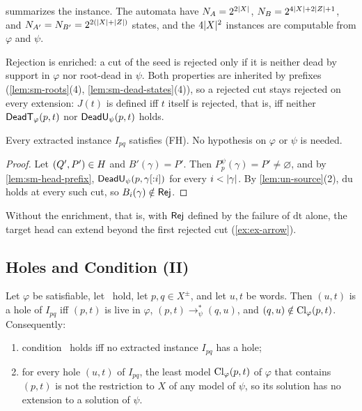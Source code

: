  summarizes the instance. The automata have
$N_A=2^{2\lvert X\rvert}$, $N_B=2^{4\lvert X\rvert+2\lvert Z\rvert+1}$, and
$N_{A'}=N_{B'}=2^{2(\lvert X\rvert+\lvert Z\rvert)}$ states, and the $4\lvert X\rvert^2$ instances are
computable from $\varphi$ and $\psi$.

Rejection is enriched: a cut of the seed is rejected only if it is neither
dead by support in $\varphi$ nor root-dead in $\psi$. Both properties are
inherited by prefixes (\cref{lem:sm-roots}(4), \cref{lem:sm-dead-states}(4)),
so a rejected cut stays rejected on every extension: $J(t)$ is defined iff $t$
itself is rejected, that is, iff neither $\mathsf{DeadT}_\varphi(p,t)$ nor
$\mathsf{DeadU}_\psi(p,t)$ holds.

\begin{lemma}\label{lem:ex-fh}
Every extracted instance $I_{pq}$ satisfies (FH). No hypothesis on $\varphi$
or $\psi$ is needed.
\end{lemma}

\begin{proof}
Let $(Q',P')\in H$ and $B'(\gamma)=P'$. Then
$P^\psi_p(\gamma)=P'\ne\varnothing$, and by \cref{lem:sm-head-prefix},
$\mathsf{DeadU}_\psi(p,\gamma[{:}i])$ for every $i<\lvert \gamma\rvert$. By
\cref{lem:un-source}(2), $\mathrm{du}$ holds at every such cut, so
$B_i(\gamma)\notin\mathsf{Rej}$.
\end{proof}

Without the enrichment, that is, with $\mathsf{Rej}$ defined by the failure of
$\mathrm{dt}$ alone, the target head can extend beyond the first rejected cut
(\cref{ex:ex-arrow}).

\subsection{Holes and Condition (II)}\label{sec:ex-reduction}

\begin{theorem}\label{thm:ex-reduction}
Let $\varphi$ be satisfiable, let \CondU\ hold, let $p,q\in X^\pm$, and let
$u,t$ be words. Then $(u,t)$ is a hole of $I_{pq}$ iff $(p,t)$ is live in
$\varphi$, $(p,t)\to^*_\psi(q,u)$, and $(q,u)\notin\operatorname{Cl}_\varphi(p,t)$.
Consequently:
\begin{enumerate}[leftmargin=*]
\item condition \CondII\ holds iff no extracted instance $I_{pq}$ has a hole;
\item for every hole $(u,t)$ of $I_{pq}$, the least model $\operatorname{Cl}_\varphi(p,t)$
  of $\varphi$ that contains $(p,t)$ is not the restriction to $X$ of any
  model of $\psi$, so its solution has no extension to a solution of $\psi$.
\end{enumerate}
\end{theorem}

